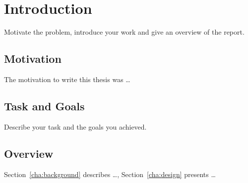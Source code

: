 \chapter{Introduction}
\label{cha:introduction}

Motivate the problem, introduce your work and give an overview of the report.

\section{Motivation}
\label{sec:motivation}

The motivation to write this thesis was \dots

\section{Task and Goals}
\label{sec:task}

Describe your task and the goals you achieved.

\section{Overview}
\label{sec:overview}
Section~\ref{cha:background} describes \dots, Section~\ref{cha:design} presents \dots